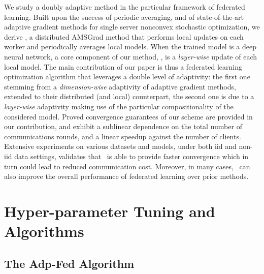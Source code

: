 \documentclass[nohyperref]{article}
\begin{document}
We study a doubly adaptive method in the particular framework of federated learning.
Built upon the success of periodic averaging, and of state-of-the-art adaptive gradient methods for single server nonconvex stochastic optimization, we derive \algo, a distributed AMSGrad method that performs local updates on each worker and periodically averages local models. 
When the trained model is a deep neural network, a core component of our method, \algo, is a \emph{layer-wise} update of each local model.
The main contribution of our paper is thus a federated learning optimization algorithm that leverages a double level of adaptivity: the first one stemming from a \emph{dimension-wise} adaptivity of adaptive gradient methods, extended to their distributed (and local) counterpart, the second one is due to a  \emph{layer-wise} adaptivity making use of the particular compositionality of the considered model.
Proved convergence guarantees of our scheme are provided in our contribution, and exhibit a sublinear dependence on the total number of communications rounds, and a linear speedup against the number of clients. Extensive experiments on various datasets and models, under both iid and non-iid data settings, validates that \algo\ is able to provide faster convergence  which in turn could lead to reduced communication cost. Moreover, in many cases, \algo\ can also improve the overall performance of federated learning over prior methods.




\clearpage






\clearpage


\appendix 
\onecolumn

  \hsize\textwidth
  \linewidth\hsize {}
 \bottomtitlebar 
 
  \vspace{0.5in}
 
 \section{Hyper-parameter Tuning and Algorithms} \label{app:experiment}


\subsection{The Adp-Fed Algorithm~\citep{reddi2020adaptive}}
\end{document}
